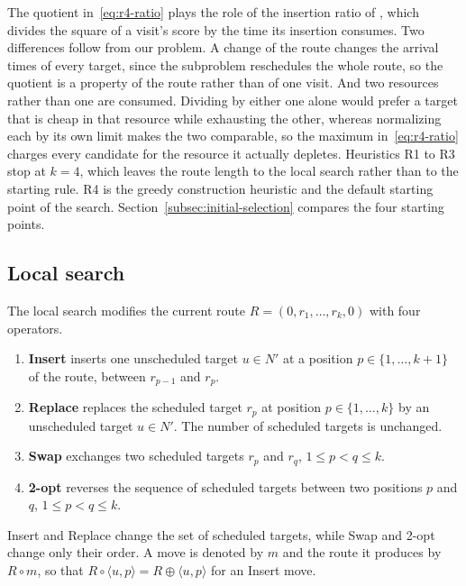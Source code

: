 \documentclass[11pt]{article}
\let\originalsubsection\subsection
\renewcommand{\subsection}{\FloatBarrier\originalsubsection}
\begin{document}
The quotient in~\eqref{eq:r4-ratio} plays the role of the insertion ratio of \citep{vansteenwegen2009iterated}, which divides the square of a visit's score by the time its insertion consumes. Two differences follow from our problem. A change of the route changes the arrival times of every target, since the subproblem reschedules the whole route, so the quotient is a property of the route rather than of one visit. And two resources rather than one are consumed. Dividing by either one alone would prefer a target that is cheap in that resource while exhausting the other, whereas normalizing each by its own limit makes the two comparable, so the maximum in~\eqref{eq:r4-ratio} charges every candidate for the resource it actually depletes. Heuristics R1 to R3 stop at $k = 4$, which leaves the route length to the local search rather than to the starting rule. R4 is the greedy construction heuristic and the default starting point of the search. Section~\ref{subsec:initial-selection} compares the four starting points.

\subsection{Local search}\label{subsec:proposal}\label{subsec:operators}

The local search modifies the current route $R = (0, r_1, \ldots, r_k, 0)$ with four operators.
\begin{enumerate}[noitemsep, topsep=4pt, leftmargin=2em]
    \item \textbf{Insert} inserts one unscheduled target $u \in N'$ at a position $p \in \{1, \ldots, k+1\}$ of the route, between $r_{p-1}$ and $r_p$.
    \item \textbf{Replace} replaces the scheduled target $r_p$ at position $p \in \{1, \ldots, k\}$ by an unscheduled target $u \in N'$. The number of scheduled targets is unchanged.
    \item \textbf{Swap} exchanges two scheduled targets $r_p$ and $r_q$, $1 \le p < q \le k$.
    \item \textbf{2-opt} reverses the sequence of scheduled targets between two positions $p$ and $q$, $1 \le p < q \le k$.
\end{enumerate}
Insert and Replace change the set of scheduled targets, while Swap and 2-opt change only their order. A move is denoted by $m$ and the route it produces by $R \circ m$, so that $R \circ \langle u, p \rangle = R \oplus \langle u, p \rangle$ for an Insert move.
\end{document}
